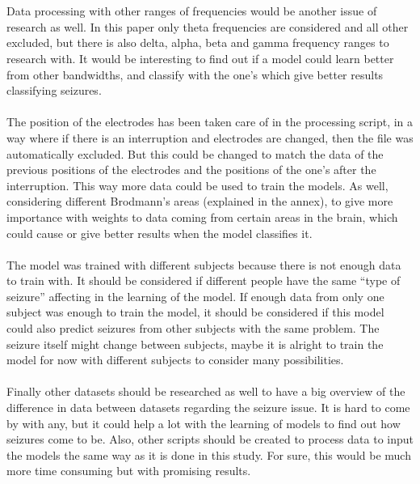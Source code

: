 \\\\
Data processing with other ranges of frequencies would be another issue of research as well. In this paper only theta frequencies are considered and all other excluded, but there is also delta, alpha, beta and gamma frequency ranges to research with. It would be interesting to find out if a model could learn better from other bandwidths, and classify with the one’s which give better results classifying seizures.
\\\\
The position of the electrodes has been taken care of in the processing script, in a way where if there is an interruption and electrodes are changed, then the file was automatically excluded. But this could be changed to match the data of the previous positions of the electrodes and the positions of the one’s after the interruption. This way more data could be used to train the models. As well, considering different Brodmann’s areas (explained in the annex), to give more importance with weights to data coming from certain areas in the brain, which could cause or give better results when the model classifies it.
\\\\
The model was trained with different subjects because there is not enough data to train with. It should be considered if different people have the same “type of seizure” affecting in the learning of the model. If enough data from only one subject was enough to train the model, it should be considered if this model could also predict seizures from other subjects with the same problem. The seizure itself might change between subjects, maybe it is alright to train the model for now with different subjects to consider many possibilities. 
\\\\
Finally other datasets should be researched as well to have a big overview of the difference in data between datasets regarding the seizure issue. It is hard to come by with any, but it could help a lot with the learning of models to find out how seizures come to be. Also, other scripts should be created to process data to input the models the same way as it is done in this study. For sure, this would be much more time consuming but with promising results.
\\


